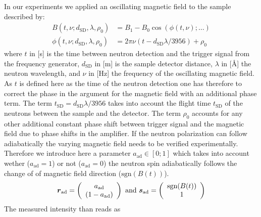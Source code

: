 In our experiments we applied an oscillating magnetic field to the sample described by:
\begin{subequations}
\begin{align}
B(t,\nu;d_\text{SD},\lambda,\rho_0) &= B_1 - B_0
\cos(\phi(t,\nu);\dots) \\
\phi(t,\nu;d_\text{SD},\lambda,\rho_0) &=2\pi\nu(t-d_\text{SD}\lambda/3956)+\rho_0
\end{align}
\end{subequations}
where $t$ in [s] is the time between neutron detection and the trigger signal
from the frequency generator, $d_\text{SD}$ in [m] is the sample
detector distance, $\lambda $ in [\AA] the neutron wavelength, and
$\nu$ in [Hz] the frequency of the oscillating magnetic field. As
$t$ is defined here as the time of the neutron detection one has
therefore to correct the phase in the argument for the magnetic
field with an additional phase term. The term
$t_\text{SD}=d_\text{SD}\lambda/3956$ takes into account the flight
time $t_\text{SD}$ of the neutrons between the sample and the
detector. The term  $\rho_0$ accounts for any other
additional constant phase shift between trigger signal and the
magnetic field due to phase shifts in the amplifier.
If the neutron polarization can follow adiabatically the varying magnetic field needs to be verified
experimentally. Therefore we introduce here a parameter $a_\text{ad} \in [0;1]$ which takes into account
wether ($a_\text{ad}=1$) or not ($a_\text{ad}=0$) the neutron spin adiabatically follows the change
of of magnetic field direction ($\text{sgn}(B(t))$).
\begin{align}
\BM{r}_\text{ad} =
\left(
  \begin{array}{c}
     a_\text{ad} \\
     (1-a_\text{ad}) \\
  \end{array}
\right)
\text{ and }
\BM{s}_\text{ad} =
\left(
  \begin{array}{c}
     \text{sgn}(B(t)) \\
     1 \\
  \end{array}
\right)
\end{align}
The measured intensity than reads as
